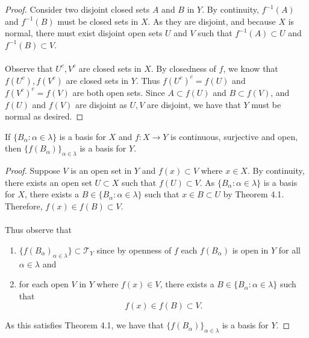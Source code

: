 \documentclass[letter,12pt,twoside]{hmcpset}
\begin{document}
\begin{proof}
    Consider two disjoint closed sets $A$ and $B$ in $Y$. By
    continuity, $f^{-1}(A)$ and $f^{-1}(B)$ must be closed sets in
    $X$. As they are disjoint, and because $X$ is normal,
    there must exist disjoint open sets $U$
    and $V$ such that $f^{-1}(A) \subset U$ and $f^{-1}(B) \subset V$.
    \\
    \\
    Observe that $U^c, V^c$ are closed sets in $X$. By closedness of
    $f$, we know that $f(U^c), f(V^c)$ are closed sets in $Y$. Thus
    $f(U^c)^c = f(U)$ and $f(V^c)^c = f(V)$ are both open sets. Since
    $A \subset f(U)$ and $B \subset f(V)$, and $f(U)$ and $f(V)$ are
    disjoint as $U, V$ are disjoint, we have that $Y$ must be normal
    as desired.


\end{proof}

\begin{problem}[Theorem 8.22]
    If $\{B_\alpha : \alpha \in \lambda\}$ is a basis for $X$ and $f:
    X \rightarrow Y$ is continuous, surjective and open, then
    $\{f(B_\alpha)\}_{\alpha \in \lambda}$ is a basis for $Y$.
\end{problem}

\begin{proof}
    Suppose $V$ is an open set in $Y$ and $f(x) \subset V$ where $x
    \in X$. By continuity, there exists an open set $U \subset X$ such
    that $f(U) \subset V$. As $\{B_\alpha : \alpha \in \lambda\}$ is a
    basis for $X$, there exists a $B \in \{B_\alpha : \alpha \in
    \lambda\}$ such that $x \in B \subset U$ by Theorem 4.1.
    Therefore, $f(x) \in f(B) \subset V$. 
    \\
    \\
    Thus observe that 
    \begin{enumerate}
        \item 
        $\{f(B_\alpha)_{\alpha \in \lambda}\} \subset \mathscr{T}_Y$
        since by openness of $f$ each $f(B_\alpha)$ is open in $Y$ for all
        $\alpha \in \lambda$ and 
        
        \item for each open $V$ in $Y$ where $f(x)
        \in V$, there exists a $B \in
        \{B_\alpha : \alpha \in \lambda\}$ such that
        \[
            f(x) \in f(B) \subset V.
        \]
        \end{enumerate}
        As this satisfies Theorem 4.1, we have that
        $\{f(B_\alpha)\}_{\alpha \in \lambda}$ is a basis for $Y$.
    \end{proof}
\end{document}
